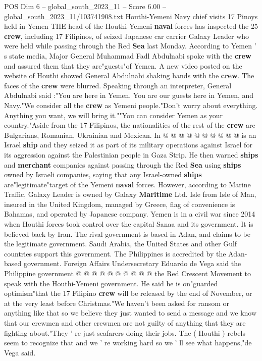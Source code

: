 \begin{textsample}{POS Dim 6 – global\_south\_2023\_11 – Score 6.00 – global\_south\_2023\_11/103741908.txt}  \label{ex:f6_pos_306}
Houthi-Yemeni Navy chief visits 17 Pinoys held in Yemen THE head of the Houthi-Yemeni \textbf{naval} forces has inspected the 25 \textbf{crew}, including 17 Filipinos, of seized Japanese car carrier Galaxy Leader who were held while passing through the Red \textbf{Sea} last Monday.
According to Yemen ' s state media, Major General Muhammad Fadl Abdulnabi spoke with the \textbf{crew} and assured them that they are"guests"of Yemen.
A new video posted on the website of Houthi showed General Abdulnabi shaking hands with the \textbf{crew}.
The faces of the \textbf{crew} were blurred.
Speaking through an interpreter, General Abdulnabi said :"You are here in Yemen.
You are our guests here in Yemen, and Navy."We consider all the \textbf{crew} as Yemeni people."Don't worry about everything.
Anything you want, we will bring it.""You can consider Yemen as your country."Aside from the 17 Filipinos, the nationalities of the rest of the \textbf{crew} are Bulgarians, Romanian, Ukrainian and Mexican.
In @ @ @ @ @ @ @ @ @ @ is an Israel \textbf{ship} and they seized it as part of its military operations against Israel for its aggression against the Palestinian people in Gaza Strip.
He then warned \textbf{ships} and \textbf{merchant} companies against passing through the Red \textbf{Sea} using \textbf{ships} owned by Israeli companies, saying that any Israel-owned \textbf{ships} are"legitimate"target of the Yemeni \textbf{naval} forces.
However, according to Marine Traffic, Galaxy Leader is owned by Galaxy \textbf{Maritime} Ltd.
Isle from Isle of Man, insured in the United Kingdom, managed by Greece, flag of convenience is Bahamas, and operated by Japanese company.
Yemen is in a civil war since 2014 when Houthi forces took control over the capital Sanaa and its government.
It is believed back by Iran.
The rival government is based in Adan, and claims to be the legitimate government.
Saudi Arabia, the United States and other Gulf countries support this government.
The Philippines is accredited by the Adan-based government.
Foreign Affairs Undersecretary Eduardo de Vega said the Philippine government @ @ @ @ @ @ @ @ @ @ the Red Crescent Movement to speak with the Houthi-Yemeni government.
He said he is on"guarded optimism"that the 17 Filipino \textbf{crew} will be released by the end of November, or at the very least before Christmas."We haven't been asked for ransom or anything like that so we believe they just wanted to send a message and we know that our crewmen and other crewmen are not guilty of anything that they are fighting about."They ' re just seafarers doing their jobs.
The ( Houthi ) rebels seem to recognize that and we ' re working hard so we ' ll see what happens,"de Vega said.

\end{textsample}
